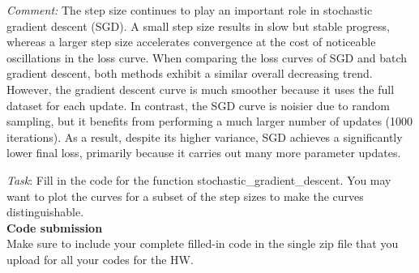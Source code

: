 \textit{Comment:} The step size continues to play an important role in stochastic gradient descent (SGD). 
A small step size results in slow but stable progress, whereas a larger step size accelerates convergence at the cost of noticeable oscillations in the loss curve. 
When comparing the loss curves of SGD and batch gradient descent, both methods exhibit a similar overall decreasing trend. 
However, the gradient descent curve is much smoother because it uses the full dataset for each update. 
In contrast, the SGD curve is noisier due to random sampling, but it benefits from performing a much larger number of updates (1000 iterations). 
As a result, despite its higher variance, SGD achieves a significantly lower final loss, primarily because it carries out many more parameter updates.


\bigskip
\noindent \emph{Task}: Fill in the code for the function \colorbox{Gainsboro!60!Lavender}{stochastic\_gradient\_descent}. You may want to plot the curves for a subset of the step sizes to make the curves distinguishable. \\

\textbf{Code submission}\\

Make sure to include your complete filled-in code in the single zip file that you upload for all your codes for the HW.
